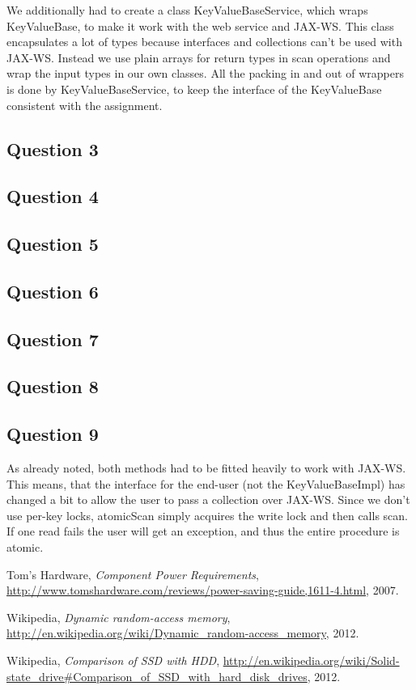 \documentclass[a4paper,final]{article}
\newcommand{\mono}[1]{{\ttfamily#1}}
\begin{document}
We additionally had to create a class \mono{KeyValueBaseService}, which wraps
\mono{KeyValueBase}, to make it work with the web service and JAX-WS. This
class encapsulates a lot of types because interfaces and collections can't be
used with JAX-WS. Instead we use plain arrays for return types in scan
operations and wrap the input types in our own classes. All the packing in
and out of wrappers is done by \mono{KeyValueBaseService}, to keep the
interface of the \mono{KeyValueBase} consistent with the assignment.

\subsection*{Question 3}

\subsection*{Question 4}

\subsection*{Question 5}

\subsection*{Question 6}

\subsection*{Question 7}

\subsection*{Question 8}

\subsection*{Question 9}
As already noted, both methods had to be fitted heavily to work with JAX-WS.
This means, that the interface for the end-user (not the
\mono{KeyValueBaseImpl}) has changed a bit to allow the user to pass a
collection over JAX-WS. Since we don't use per-key locks, \mono{atomicScan}
simply acquires the write lock and then calls \mono{scan}. If one read fails
the user will get an exception, and thus the entire procedure is atomic.


\begin{thebibliography}{9}
    Tom's Hardware,
    \emph{Component Power Requirements},
    \url{http://www.tomshardware.com/reviews/power-saving-guide,1611-4.html},
    2007.

    Wikipedia,
    \emph{Dynamic random-access memory},
    \url{http://en.wikipedia.org/wiki/Dynamic_random-access_memory},
    2012.

    Wikipedia,
    \emph{Comparison of SSD with HDD},
    \url{http://en.wikipedia.org/wiki/Solid-state_drive#Comparison_of_SSD_with_hard_disk_drives},
    2012.
\end{thebibliography}
\end{document}
